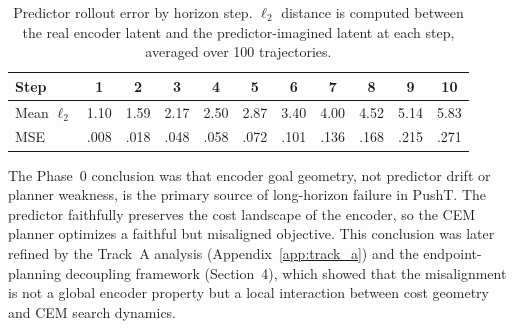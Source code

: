 \begin{table}[h]
\centering
\caption{Predictor rollout error by horizon step.  $\ell_2$ distance is
computed between the real encoder latent and the predictor-imagined latent at
each step, averaged over 100 trajectories.}
\label{tab:pred-error}
\begin{tabular}{lcccccccccc}
\toprule
Step & 1 & 2 & 3 & 4 & 5 & 6 & 7 & 8 & 9 & 10 \\
\midrule
Mean $\ell_2$ & 1.10 & 1.59 & 2.17 & 2.50 & 2.87 & 3.40 & 4.00 & 4.52 & 5.14 & 5.83 \\
MSE & .008 & .018 & .048 & .058 & .072 & .101 & .136 & .168 & .215 & .271 \\
\bottomrule
\end{tabular}
\end{table}

The Phase~0 conclusion was that encoder goal geometry, not predictor drift or
planner weakness, is the primary source of long-horizon failure in PushT.  The
predictor faithfully preserves the cost landscape of the encoder, so the CEM
planner optimizes a faithful but misaligned objective.  This conclusion was
later refined by the Track~A analysis (Appendix~\ref{app:track_a}) and the
endpoint-planning decoupling framework (Section~4), which showed that the
misalignment is not a global encoder property but a local interaction between
cost geometry and CEM search dynamics.
